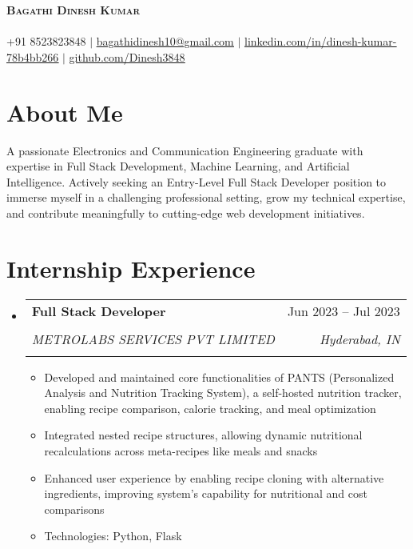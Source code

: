 \documentclass[letterpaper,9pt]{article}
\makeatletter
\newcommand{\resumeItem}[1]{
  \item\small{
    {#1 \vspace{-2pt}}
  }
}
\newcommand{\resumeSubheading}[4]{
  \vspace{-2pt}\item
    \begin{tabular*}{0.97\textwidth}[t]{l@{\extracolsep{\fill}}r}
      \textbf{#1} & #2 \\\\
      \textit{\small#3} & \textit{\small #4} \\\\
    \end{tabular*}\vspace{-7pt}
}
\newcommand{\resumeSubHeadingListStart}{\begin{itemize}[leftmargin=0.15in, label={}]}
\newcommand{\resumeSubHeadingListEnd}{\end{itemize}}
\newcommand{\resumeItemListStart}{\begin{itemize}}
\newcommand{\resumeItemListEnd}{\end{itemize}\vspace{-5pt}}
\makeatother
\begin{document}
\begin{center}
    \textbf{\Huge \scshape Bagathi Dinesh Kumar} \\\\ \vspace{1pt}
    \small +91 8523823848 $|$ \href{mailto:bagathidinesh10@gmail.com}{\underline{bagathidinesh10@gmail.com}} $|$ 
    \href{https://linkedin.com/in/dinesh-kumar-78b4bb266}{\underline{linkedin.com/in/dinesh-kumar-78b4bb266}} $|$
    \href{https://github.com/Dinesh3848}{\underline{github.com/Dinesh3848}}
\end{center}

\section{About Me}
A passionate Electronics and Communication Engineering graduate with expertise in Full Stack Development, Machine Learning, and Artificial Intelligence. Actively seeking an Entry-Level Full Stack Developer position to immerse myself in a challenging professional setting, grow my technical expertise, and contribute meaningfully to cutting-edge web development initiatives.

\section{Internship Experience}
  \resumeSubHeadingListStart

    \resumeSubheading
      {Full Stack Developer}{Jun 2023 -- Jul 2023}
      {METROLABS SERVICES PVT LIMITED}{Hyderabad, IN}
      \resumeItemListStart
        \resumeItem{Developed and maintained core functionalities of PANTS (Personalized Analysis and Nutrition Tracking System), a self-hosted nutrition tracker, enabling recipe comparison, calorie tracking, and meal optimization}
        \resumeItem{Integrated nested recipe structures, allowing dynamic nutritional recalculations across meta-recipes like meals and snacks}
        \resumeItem{Enhanced user experience by enabling recipe cloning with alternative ingredients, improving system's capability for nutritional and cost comparisons}
        \resumeItem{Technologies: Python, Flask}
      \resumeItemListEnd

  \resumeSubHeadingListEnd

\end{document}
